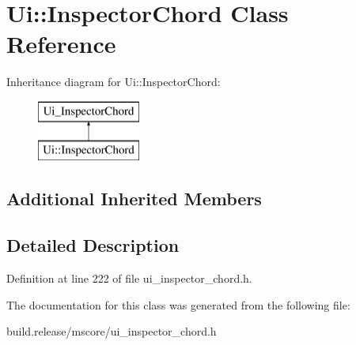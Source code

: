 \hypertarget{class_ui_1_1_inspector_chord}{}\section{Ui\+:\+:Inspector\+Chord Class Reference}
\label{class_ui_1_1_inspector_chord}
Inheritance diagram for Ui\+:\+:Inspector\+Chord\+:\begin{figure}[H]
\begin{center}
\leavevmode
\includegraphics[height=2.000000cm]{class_ui_1_1_inspector_chord}
\end{center}
\end{figure}
\subsection*{Additional Inherited Members}


\subsection{Detailed Description}


Definition at line 222 of file ui\+\_\+inspector\+\_\+chord.\+h.



The documentation for this class was generated from the following file\+:\begin{DoxyCompactItemize}
\item 
build.\+release/mscore/ui\+\_\+inspector\+\_\+chord.\+h\end{DoxyCompactItemize}

